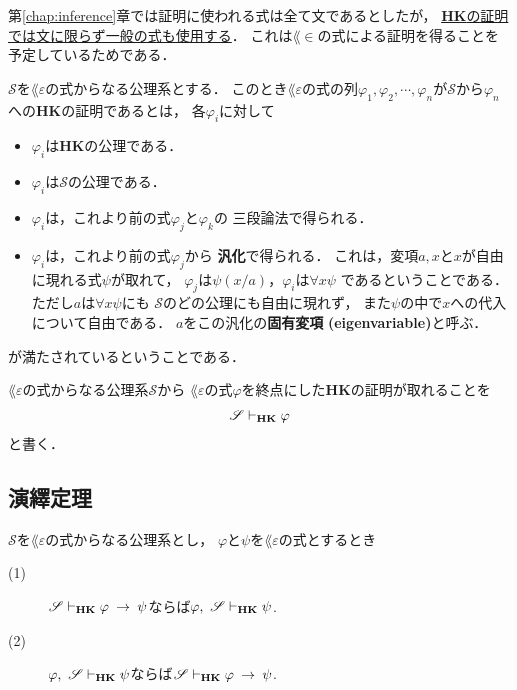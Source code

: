 	第\ref{chap:inference}章では証明に使われる式は全て文であるとしたが，
	\underline{{\bf HK}の証明では文に限らず一般の式も使用する}．
	これは$\lang{\in}$の式による証明を得ることを予定しているためである．
	
	\begin{screen}
		\begin{metadfn}[{\bf HK}における証明]
			$\mathscr{S}$を$\lang{\varepsilon}$の式からなる公理系とする．
			このとき$\lang{\varepsilon}$の式の列$\varphi_{1},\varphi_{2},\cdots,
			\varphi_{n}$が$\mathscr{S}$から$\varphi_{n}$への{\bf HK}の証明であるとは，
			各$\varphi_{i}$に対して
			\begin{itemize}
				\item $\varphi_{i}$は{\bf HK}の公理である．
				\item $\varphi_{i}$は$\mathscr{S}$の公理である．
				\item $\varphi_{i}$は，これより前の式$\varphi_{j}$と$\varphi_{k}$の
					三段論法で得られる．
				\item $\varphi_{i}$は，これより前の式$\varphi_{j}$から
					{\bf 汎化}で得られる．
					これは，変項$a,x$と$x$が自由に現れる式$\psi$が取れて，
					$\varphi_{j}$は$\psi(x/a)$，$\varphi_{i}$は$\forall x \psi$
					であるということである．ただし$a$は$\forall x \psi$にも
					$\mathscr{S}$のどの公理にも自由に現れず，
					また$\psi$の中で$x$への代入について自由である．
					$a$をこの汎化の{\bf 固有変項}
					{\bf (eigenvariable)}と呼ぶ．
			\end{itemize}
			が満たされているということである．
		\end{metadfn}
	\end{screen}
	
	$\lang{\varepsilon}$の式からなる公理系$\mathscr{S}$から
	$\lang{\varepsilon}$の式$\varphi$を終点にした{\bf HK}の証明が取れることを
	\begin{align}
		\mathscr{S} \vdash_{{\scriptsize \mbox{{\bf HK}}}} \varphi
	\end{align}
	と書く．
	
\subsection{演繹定理}
	\begin{screen}
		\begin{metathm}[{\bf HK}の演繹定理]
		\label{metathm:deduction_theorem_of_HK}
			$\mathscr{S}$を$\lang{\varepsilon}$の式からなる公理系とし，
			$\varphi$と$\psi$を$\lang{\varepsilon}$の式とするとき
			\begin{description}
				\item[(1)] $\mathscr{S} \vdash_{{\scriptsize \mbox{{\bf HK}}}} \varphi \hspace{0.25em}\rightarrow\hspace{0.25em} \psi$ならば$\varphi,\ \mathscr{S} \provable{\mbox{{\bf HK}}} \psi$.
				\item[(2)] $\varphi,\ \mathscr{S} \provable{\mbox{{\bf HK}}} \psi$ならば$\mathscr{S} \vdash_{{\scriptsize \mbox{{\bf HK}}}} \varphi \hspace{0.25em}\rightarrow\hspace{0.25em} \psi$.
			\end{description}
		\end{metathm}
	\end{screen}
	
